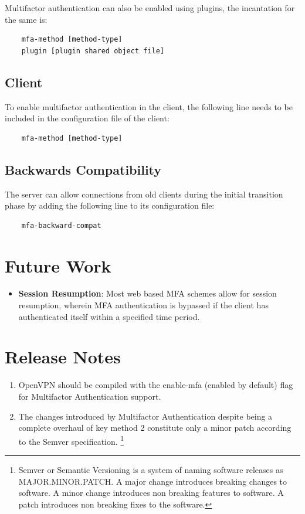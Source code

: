 \documentclass[11pt,oneside]{book}
\begin{document}
\noindent Multifactor authentication can also be enabled using plugins, the incantation for the same is:
\begin{verbatim}
    mfa-method [method-type]
    plugin [plugin shared object file]
\end{verbatim}

\subsection{Client}
To enable multifactor authentication in the client, the following line needs to be included in the
configuration file of the client:

\begin{verbatim}
    mfa-method [method-type]
\end{verbatim}

\subsection{Backwards Compatibility}
\label{MFA:BackwardCompat}
The server can allow connections from old clients during the initial transition phase by adding
the following line to its configuration file:

\begin{verbatim}
    mfa-backward-compat
\end{verbatim}

\section{Future Work}
\begin{itemize}
    \item \textbf{Session Resumption}: Most web based MFA schemes allow for session resumption,
        wherein MFA authentication is bypassed if the client has authenticated itself within
        a specified time period.
\end{itemize}

\section{Release Notes}
\begin{enumerate}
    \item OpenVPN should be compiled with the enable-mfa (enabled by default) flag for Multifactor
        Authentication support.
    \item The changes introduced by Multifactor Authentication despite being a complete overhaul of key method
          2 constitute only a minor patch according to the Semver specification. \footnote{Semver or Semantic
          Versioning is a system of naming software releases as MAJOR.MINOR.PATCH. A major change introduces
          breaking changes to software. A minor change introduces non breaking features to software.
          A patch introduces non breaking fixes to the software.}
\end{enumerate}
\end{document}
